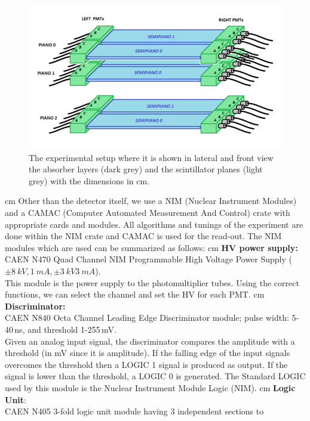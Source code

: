 	\begin{figure}
		\centering
		\includegraphics[width=1\textwidth]{figures/33.png}
		\caption{The experimental setup where it is shown in lateral and front view the absorber layers (dark grey) and the scintillator planes (light grey) with the dimensions in cm.}
		\label{fig:Setup}
	\end{figure}
	 cm
	Other than the detector itself, we use a NIM (Nuclear Instrument Modules) and a 
    CAMAC (Computer Automated Measurement And Control) crate with appropriate cards and modules.
    All algorithms and tunings of the experiment are done within the NIM crate and CAMAC is used
    for the read-out. The NIM modules which are used can be summarized as follows: 
	 cm
	\textbf{HV power supply:}\\ CAEN N470 Quad Channel NIM Programmable High Voltage
    Power Supply ($\pm \SI{8}{kV}, \SI{1}{mA}, \pm \SI{3}{kV}  \SI{3}{mA}$).\\
	This module is the power supply to the photomultiplier tubes. Using the correct functions,
    we can select the channel and set the HV for each PMT.
	 cm
	\textbf{Discriminator:}\\ CAEN N840 Octa Channel Leading Edge Discriminator module; pulse width:
    5-40\,ns, and threshold 1-255\,mV.\\
	Given an analog input signal, the discriminator compares the amplitude with a threshold 
    (in mV since it is amplitude). If the falling edge of the input signals overcomes the threshold
    then a LOGIC 1 signal is produced as output. If the signal is lower than the threshold,
    a LOGIC 0 is generated. The Standard LOGIC used by this module is the Nuclear Instrument
    Module Logic (NIM).
	 cm
	\textbf{Logic Unit}:\\ CAEN N405 3-fold logic unit module having 3 independent sections to
